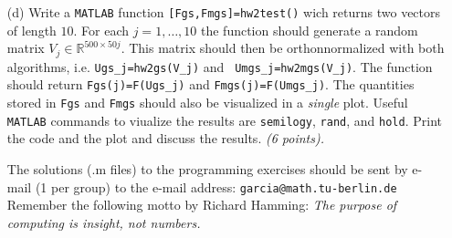 \documentclass[10pt]{report}
\begin{document}
\begin{enumerate}
\begin{enumerate}
    \item[(d)]  Write a \verb+MATLAB+ function \verb+[Fgs,Fmgs]=hw2test()+ wich
    returns two vectors of length $10$. For each $j=1,\ldots,10$ the function
    should generate a random matrix $V_j\in\mathbb{R}^{500\times50j}$. This
    matrix should then be orthonnormalized with both algorithms, i.e.
    \verb+Ugs_j=hw2gs(V_j)+ and \verb+ Umgs_j=hw2mgs(V_j)+. The function should return
    \verb+Fgs(j)=F(Ugs_j)+ and \verb+Fmgs(j)=F(Umgs_j)+. The quantities stored in \verb+Fgs+
    and \verb+Fmgs+ should also be visualized in a \textit{single} plot. Useful \verb+MATLAB+ commands to viualize the results are \verb+semilogy+, \verb+rand+, and \verb+hold+. Print the code and the plot and discuss  the results. \textit{(6 points).}
\vspace{0.3em}

The solutions (.m files) to the programming exercises should be sent by e-mail (1 per group) to the e-mail address: \verb+garcia@math.tu-berlin.de+ \\

Remember the following motto by Richard Hamming: 
\textit{The purpose of computing is insight, not numbers.}
\end{enumerate}




\end{enumerate}
\end{document}
